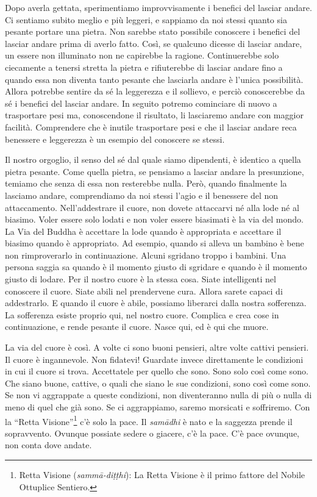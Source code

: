 Dopo averla gettata, sperimentiamo improvvisamente i benefici del
lasciar andare. Ci sentiamo subito meglio e più leggeri, e sappiamo da
noi stessi quanto sia pesante portare una pietra. Non sarebbe stato
possibile conoscere i benefici del lasciar andare prima di averlo fatto.
Così, se qualcuno dicesse di lasciar andare, un essere non illuminato
non ne capirebbe la ragione. Continuerebbe solo ciecamente a tenersi
stretta la pietra e rifiuterebbe di lasciar andare fino a quando essa
non diventa tanto pesante che lasciarla andare è l'unica possibilità.
Allora potrebbe sentire da sé la leggerezza e il sollievo, e perciò
conoscerebbe da sé i benefici del lasciar andare. In seguito potremo
cominciare di nuovo a trasportare pesi ma, conoscendone il risultato, li
lasciaremo andare con maggior facilità. Comprendere che è inutile
trasportare pesi e che il lasciar andare reca benessere e leggerezza è
un esempio del conoscere se stessi.

Il nostro orgoglio, il senso del sé dal quale siamo dipendenti, è
identico a quella pietra pesante. Come quella pietra, se pensiamo a
lasciar andare la presunzione, temiamo che senza di essa non resterebbe
nulla. Però, quando finalmente la lasciamo andare, comprendiamo da noi
stessi l'agio e il benessere del non attaccamento. Nell'addestrare il
cuore, non dovete attaccarvi né alla lode né al biasimo. Voler essere
solo lodati e non voler essere biasimati è la via del mondo. La Via del
Buddha è accettare la lode quando è appropriata e accettare il biasimo
quando è appropriato. Ad esempio, quando si alleva un bambino è bene non
rimproverarlo in continuazione. Alcuni sgridano troppo i bambini. Una
persona saggia sa quando è il momento giusto di sgridare e quando è il
momento giusto di lodare. Per il nostro cuore è la stessa cosa. Siate
intelligenti nel conoscere il cuore. Siate abili nel prendervene cura.
Allora sarete capaci di addestrarlo. E quando il cuore è abile, possiamo
liberarci dalla nostra sofferenza. La sofferenza esiste proprio qui, nel
nostro cuore. Complica e crea cose in continuazione, e rende pesante il
cuore. Nasce qui, ed è qui che muore.

La via del cuore è così. A volte ci sono buoni pensieri, altre volte
cattivi pensieri. Il cuore è ingannevole. Non fidatevi! Guardate invece
direttamente le condizioni in cui il cuore si trova. Accettatele per
quello che sono. Sono solo così come sono. Che siano buone, cattive, o
quali che siano le sue condizioni, sono così come sono. Se non vi
aggrappate a queste condizioni, non diventeranno nulla di più o nulla di
meno di quel che già sono. Se ci aggrappiamo, saremo morsicati e
soffriremo. Con la ``Retta Visione''\footnote{Retta Visione
  (\emph{sammā-diṭṭhi}): La Retta Visione è il primo fattore del Nobile
  Ottuplice Sentiero.} c'è solo la pace. Il \emph{samādhi} è nato e la
saggezza prende il sopravvento. Ovunque possiate sedere o giacere, c'è
la pace. C'è pace ovunque, non conta dove andate.

